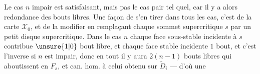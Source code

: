 Le cas $n$ impair est satisfaisant, mais pas le cas pair tel quel, car il y a alors redondance des bouts libres. Une façon de s'en tirer dans tous les cas, c'est de  la carte $\mathcal X_0$, et de la modifier en remplaçant chaque sommet supercritique $s$ par un petit disque supercritique.
 Dans le cas $n$  chaque face sous-stable incidente à $s$ contribue $\unsure{1|0}$ bout libre, et chaque face stable incidente $1$ bout, et c'est l'inverse si $n$ est impair, donc en tout il y aura $2(n-1)$ bouts libres  qui aboutissent en $F_s$, et  can. hom. à celui obtenu sur $\widetilde D_i$ --- d'où une
